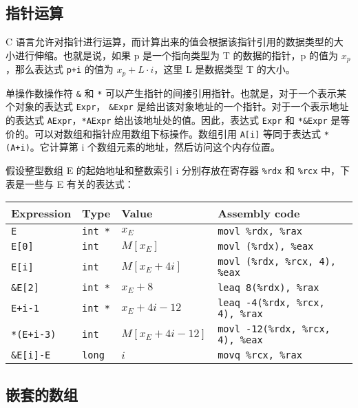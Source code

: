 \subsection{指针运算}

C 语言允许对指针进行运算，而计算出来的值会根据该指针引用的数据类型的大小进行伸缩。也就是说，如果 p 是一个指向类型为 T 的数据的指针，p 的值为 $x_p$，那么表达式 \verb|p+i| 的值为 $x_p + L \cdot i$，这里 L 是数据类型 T 的大小。

单操作数操作符 \verb|&| 和 \verb|*| 可以产生指针的间接引用指针。也就是，对于一个表示某个对象的表达式 \verb|Expr|， \verb|&Expr| 是给出该对象地址的一个指针。对于一个表示地址的表达式 \verb|AExpr|，\verb|*AExpr| 给出该地址处的值。因此，表达式 \verb|Expr| 和 \verb|*&Expr| 是等价的。可以对数组和指针应用数组下标操作。数组引用 \verb|A[i]| 等同于表达式 \verb|*(A+i)|。它计算第 i 个数组元素的地址，然后访问这个内存位置。

假设整型数组 E 的起始地址和整数索引 i 分别存放在寄存器 \verb|%rdx| 和 \verb|%rcx| 中，下表是一些与 E 有关的表达式：
\begin{table}[!ht]
    \centering
    \begin{tabular}{llll}
        \toprule
        Expression & Type & Value & Assembly code \\
        \midrule
        \texttt{E}        & \texttt{int *} & $x_E$              & \texttt{movl \%rdx, \%rax} \\
        \texttt{E[0]}     & \texttt{int}   & $M[x_E]$           & \texttt{movl (\%rdx), \%eax} \\
        \texttt{E[i]}     & \texttt{int}   & $M[x_E + 4i]$      & \texttt{movl (\%rdx, \%rcx, 4), \%eax} \\
        \texttt{\&E[2]}   & \texttt{int *} & $x_E + 8$          & \texttt{leaq 8(\%rdx), \%rax} \\
        \texttt{E+i-1}    & \texttt{int *} & $x_E + 4i - 12$    & \texttt{leaq -4(\%rdx, \%rcx, 4), \%rax} \\
        \texttt{*(E+i-3)} & \texttt{int}   & $M[x_E + 4i - 12]$ & \texttt{movl -12(\%rdx, \%rcx, 4), \%eax} \\
        \texttt{\&E[i]-E} & \texttt{long}  & $i$                & \texttt{movq \%rcx, \%rax} \\
        \bottomrule
    \end{tabular}
\end{table}

\subsection{嵌套的数组}

